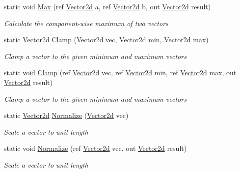\begin{DoxyCompactItemize}
static void \hyperlink{struct_open_t_k_1_1_vector2d_a7e3fb96a578d026bcb224d48fe0e6bcd}{Max} (ref \hyperlink{struct_open_t_k_1_1_vector2d}{Vector2d} a, ref \hyperlink{struct_open_t_k_1_1_vector2d}{Vector2d} b, out \hyperlink{struct_open_t_k_1_1_vector2d}{Vector2d} result)
\begin{DoxyCompactList}\small\item\em Calculate the component-\/wise maximum of two vectors \end{DoxyCompactList}\item 
static \hyperlink{struct_open_t_k_1_1_vector2d}{Vector2d} \hyperlink{struct_open_t_k_1_1_vector2d_a108801468e6e0af6ae59f9af67c2093e}{Clamp} (\hyperlink{struct_open_t_k_1_1_vector2d}{Vector2d} vec, \hyperlink{struct_open_t_k_1_1_vector2d}{Vector2d} min, \hyperlink{struct_open_t_k_1_1_vector2d}{Vector2d} max)
\begin{DoxyCompactList}\small\item\em Clamp a vector to the given minimum and maximum vectors \end{DoxyCompactList}\item 
static void \hyperlink{struct_open_t_k_1_1_vector2d_afb0928c5d97706c011362a530e647d25}{Clamp} (ref \hyperlink{struct_open_t_k_1_1_vector2d}{Vector2d} vec, ref \hyperlink{struct_open_t_k_1_1_vector2d}{Vector2d} min, ref \hyperlink{struct_open_t_k_1_1_vector2d}{Vector2d} max, out \hyperlink{struct_open_t_k_1_1_vector2d}{Vector2d} result)
\begin{DoxyCompactList}\small\item\em Clamp a vector to the given minimum and maximum vectors \end{DoxyCompactList}\item 
static \hyperlink{struct_open_t_k_1_1_vector2d}{Vector2d} \hyperlink{struct_open_t_k_1_1_vector2d_af2c16f2f19bb27b3c33e1dd31b3235e2}{Normalize} (\hyperlink{struct_open_t_k_1_1_vector2d}{Vector2d} vec)
\begin{DoxyCompactList}\small\item\em Scale a vector to unit length \end{DoxyCompactList}\item 
static void \hyperlink{struct_open_t_k_1_1_vector2d_aa1c1de04a4d305db58a6306df85dd122}{Normalize} (ref \hyperlink{struct_open_t_k_1_1_vector2d}{Vector2d} vec, out \hyperlink{struct_open_t_k_1_1_vector2d}{Vector2d} result)
\begin{DoxyCompactList}\small\item\em Scale a vector to unit length \end{DoxyCompactList}\item 

\end{DoxyCompactItemize}
